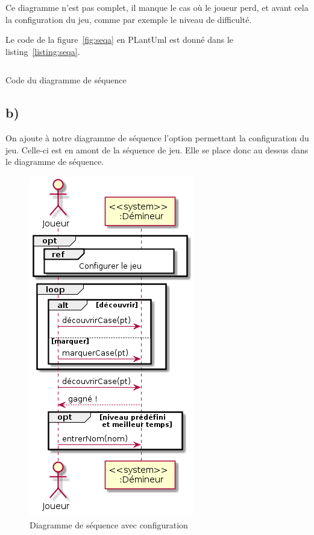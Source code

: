 \documentclass[a4paper,12pt]{article}
\begin{document}
Ce diagramme n'est pas complet, il manque le cas où le joueur perd, et avant cela la configuration du jeu, comme par exemple le niveau de difficulté.

Le code de la figure~\ref{fig:seqa} en PLantUml est donné dans le listing~\ref{listing:seqa}.

\begin{listing}[ht]
    \inputminted[bgcolor=lightgray!40,linenos=true]{fsharp}{./code-images/q2-a}
    \caption{Code du diagramme de séquence}
    \label{listing:seqa}
\end{listing}

\clearpage

\subsection{b)}\label{b}

On ajoute à notre diagramme de séquence l'option permettant la configuration du jeu. Celle-ci est en amont de la séquence de jeu. Elle se place donc au dessus dans le diagramme de séquence.

\begin{figure}[htbp]
    \centering
    \includegraphics[width=.5\textwidth]{./images/q2-b.png}
    \caption{Diagramme de séquence avec configuration}
    \label{fig:seqb}
\end{figure}
\end{document}
